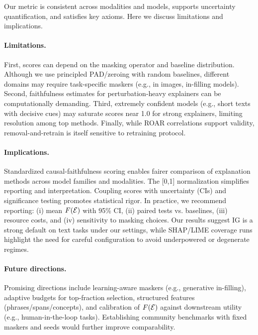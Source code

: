 Our metric is consistent across modalities and models, supports uncertainty quantification, and satisfies key axioms. Here we discuss limitations and implications.

\paragraph{Limitations.}
First, scores can depend on the masking operator and baseline distribution. Although we use principled PAD/zeroing with random baselines, different domains may require task-specific maskers (e.g., in images, in-filling models). Second, faithfulness estimates for perturbation-heavy explainers can be computationally demanding. Third, extremely confident models (e.g., short texts with decisive cues) may saturate scores near 1.0 for strong explainers, limiting resolution among top methods. Finally, while ROAR correlations support validity, removal-and-retrain is itself sensitive to retraining protocol.

\paragraph{Implications.}
Standardized causal-faithfulness scoring enables fairer comparison of explanation methods across model families and modalities. The [0,1] normalization simplifies reporting and interpretation. Coupling scores with uncertainty (CIs) and significance testing promotes statistical rigor. In practice, we recommend reporting: (i) mean $F(\mathcal{E})$ with 95\% CI, (ii) paired tests vs. baselines, (iii) resource costs, and (iv) sensitivity to masking choices. Our results suggest IG is a strong default on text tasks under our settings, while SHAP/LIME coverage runs highlight the need for careful configuration to avoid underpowered or degenerate regimes.

\paragraph{Future directions.}
Promising directions include learning-aware maskers (e.g., generative in-filling), adaptive budgets for top-fraction selection, structured features (phrases/spans/concepts), and calibration of $F(\mathcal{E})$ against downstream utility (e.g., human-in-the-loop tasks). Establishing community benchmarks with fixed maskers and seeds would further improve comparability.

